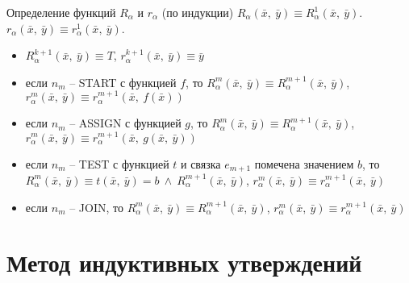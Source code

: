 \documentclass[hyperref={unicode=true}]{beamer}
\begin{document}
	\begin{frame}{Определение функций $R_\alpha$ и $r_\alpha$ (по индукции)}
	$R_\alpha (\bar{x},~\bar{y}) \equiv R_\alpha^1 (\bar{x},~\bar{y})$.
	$r_\alpha (\bar{x},~\bar{y}) \equiv r_\alpha^1 (\bar{x},~\bar{y})$.

	\begin{itemize}
		\item $R_\alpha^{k+1} (\bar{x},~\bar{y}) \equiv T$, $r_\alpha^{k+1} (\bar{x},~\bar{y}) \equiv \bar{y}$
        \item если $n_m$ -- START с функцией $f$, то $R_\alpha^m (\bar{x},~\bar{y}) \equiv R_\alpha^{m+1}(\bar{x},~\bar{y})$, $r_\alpha^m(\bar{x},~\bar{y}) \equiv r_\alpha^{m+1}(\bar{x},~f(\bar{x}))$
		\item если $n_m$ -- ASSIGN с функцией $g$, то $R_\alpha^m (\bar{x},~\bar{y}) \equiv R_\alpha^{m+1} (\bar{x},~\bar{y})$, $r_\alpha^m (\bar{x},~\bar{y}) \equiv r_\alpha^{m+1} (\bar{x},~g(\bar{x},~\bar{y}))$
		\item если $n_m$ -- TEST с функцией $t$ и связка $e_{m+1}$ помечена значением $b$, то $R_\alpha^m (\bar{x},~\bar{y}) \equiv t(\bar{x},~\bar{y}) = b~\land~R_\alpha^{m+1} (\bar{x},~\bar{y})$, $r_\alpha^m (\bar{x},~\bar{y}) \equiv r_\alpha^{m+1} (\bar{x},~\bar{y}) $
		\item если $n_m$ -- JOIN, то $R_\alpha^m (\bar{x},~\bar{y}) \equiv R_\alpha^{m+1} (\bar{x},~\bar{y})$, $r_\alpha^m (\bar{x},~\bar{y}) \equiv r_\alpha^{m+1} (\bar{x},~\bar{y}) $
	\end{itemize}
	\end{frame}

	\section{Метод индуктивных утверждений}
\end{document}
